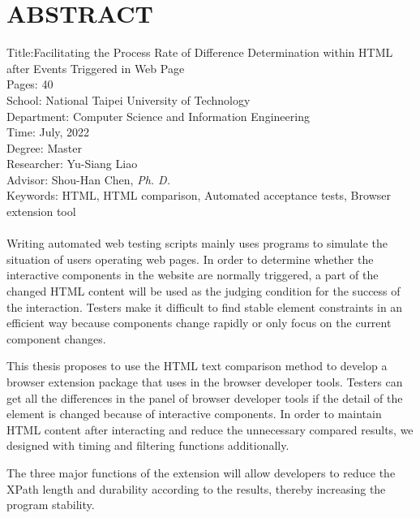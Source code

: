 \chapter*{ABSTRACT}


\noindent
Title:Facilitating the Process Rate of Difference Determination within HTML after Events Triggered in Web Page\\
Pages: 40\\
School: National Taipei University of Technology\\
Department: Computer Science and Information Engineering\\
Time: July, 2022\\
Degree: Master\\
Researcher: Yu-Siang Liao\\
Advisor: Shou-Han Chen, \emph{Ph. D.}
\hspace*{\fill}\\
Keywords: HTML, HTML comparison, Automated acceptance tests, Browser extension tool\\
\hspace*{\fill}\\
\indent
Writing automated web testing scripts mainly uses programs to simulate the situation of users operating web pages.
In order to determine whether the interactive components in the website are normally triggered, 
a part of the changed HTML content will be used as the judging condition for the success of the interaction.
Testers make it difficult to find stable element constraints in an efficient way because components change rapidly or only focus on the current component changes.

This thesis proposes to use the HTML text comparison method to develop a browser extension package that uses in the browser developer tools.
Testers can get all the differences in the panel of browser developer tools if the detail of the element is changed because of interactive components.
In order to maintain HTML content after interacting and reduce the unnecessary compared results, we designed with timing and filtering functions additionally.

The three major functions of the extension will allow developers to reduce the XPath length and durability according to the results, thereby increasing the program stability.